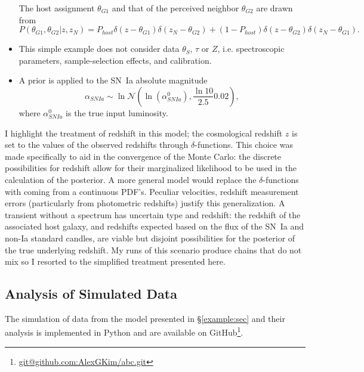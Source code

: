 \documentclass[preprint]{aastex}
\begin{document}
\begin{itemize}
The host assignment $\theta_{G1}$ and that of the perceived neighbor
$\theta_{G2}$ are drawn from
\begin{equation}
P(\theta_{G1},\theta_{G2}|z, z_N) =
	P_{host}\delta(z-\theta_{G1})\delta(z_N-\theta_{G2}) +
	(1-P_{host}) \delta(z-\theta_{G2})\delta(z_N-\theta_{G1}).
\end{equation}

\item This simple example does not consider data $\theta_S$, $\tau$ or $Z$, i.e.
spectroscopic parameters, sample-selection effects, and calibration.
\item A prior is applied to the SN~Ia absolute magnitude
\begin{equation}
\alpha_{SNIa} \sim \ln\mathcal{N}\left(\ln\left(\alpha^0_{SNIa}\right),\frac{\ln{10}}{2.5}0.02\right),
\end{equation}
where $\alpha^0_{SNIa}$ is the true input luminosity.
\end{itemize}

I highlight the treatment of redshift in this model; the cosmological redshift
$z$ is set to the values of the
observed redshifts through $\delta$-functions.  This choice was made specifically to aid
in the convergence of the Monte Carlo: the discrete possibilities for redshift allow
for their marginalized likelihood to be used in the calculation of the posterior.
A more general model would replace the $\delta$-functions
with coming from a continuous PDF's.
Peculiar velocities, redshift measurement errors (particularly from
photometric redshifts) justify this generalization.
A transient
without a spectrum has uncertain type and redshift: the redshift
of the associated host galaxy, and redshifts expected based on the
flux of the SN~Ia and non-Ia standard candles,
are viable but disjoint possibilities for the posterior of
the true underlying redshift. My runs of this scenario produce chains
that do not mix so I resorted to the simplified treatment presented here.

\subsection{Analysis of Simulated Data}
The simulation of data from the model presented in \S\ref{example:sec}
and their analysis is implemented in Python and are available
on GitHub\footnote{\url{git@github.com:AlexGKim/abc.git}}.
\end{document}
